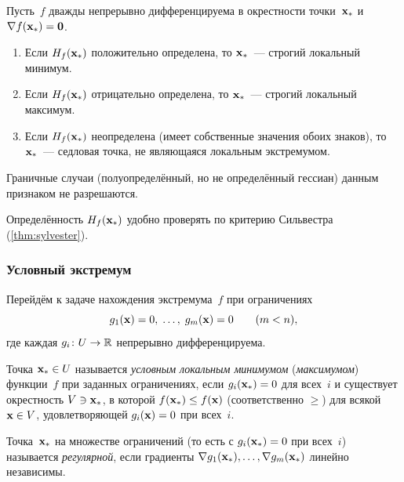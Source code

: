 \begin{theorem}
\label{thm:sufficient-uncon}
Пусть~$f$ дважды непрерывно дифференцируема в окрестности
точки~$\mathbf{x}_*$ и $\nabla f(\mathbf{x}_*) = \mathbf{0}$.
\begin{enumerate}[label=(\alph*)]
  \item Если $H_f(\mathbf{x}_*)$ положительно определена, то $\mathbf{x}_*$~---
        строгий локальный минимум.
  \item Если $H_f(\mathbf{x}_*)$ отрицательно определена, то $\mathbf{x}_*$~---
        строгий локальный максимум.
  \item Если $H_f(\mathbf{x}_*)$ неопределена (имеет собственные
        значения обоих знаков), то $\mathbf{x}_*$~--- седловая точка,
        не являющаяся локальным экстремумом.
\end{enumerate}
Граничные случаи (полуопределённый, но не определённый гессиан)
данным признаком не разрешаются.
\end{theorem}

Определённость $H_f(\mathbf{x}_*)$ удобно проверять по критерию
Сильвестра (\cref{thm:sylvester}).

\subsubsection*{Условный экстремум}

Перейдём к задаче нахождения экстремума~$f$ при ограничениях
\[
  g_1(\mathbf{x}) = 0, \;\dots, \; g_m(\mathbf{x}) = 0 \qquad (m < n),
\]
где каждая $g_i \colon U \to \mathbb{R}$ непрерывно дифференцируема.

\begin{definition}
\label{def:constrained-extremum}
Точка $\mathbf{x}_* \in U$ называется \emph{условным локальным
минимумом} (\emph{максимумом}) функции~$f$ при заданных ограничениях,
если $g_i(\mathbf{x}_*) = 0$ для всех~$i$ и существует окрестность
$V \ni \mathbf{x}_*$, в которой $f(\mathbf{x}_*) \le f(\mathbf{x})$
(соответственно $\ge$) для всякой $\mathbf{x} \in V$, удовлетворяющей
$g_i(\mathbf{x}) = 0$ при всех~$i$.
\end{definition}

\begin{definition}
\label{def:regularity}
Точка~$\mathbf{x}_*$ на множестве ограничений (то есть с
$g_i(\mathbf{x}_*) = 0$ при всех~$i$) называется \emph{регулярной},
если градиенты $\nabla g_1(\mathbf{x}_*), \dots, \nabla g_m(\mathbf{x}_*)$
линейно независимы.
\end{definition}

